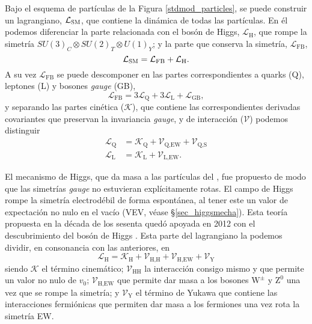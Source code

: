 Bajo el esquema de partículas de la Figura \ref{stdmod_particles}, se puede construir un lagrangiano, $\mathcal{L}_{\text{\textsc{SM}}}$, que contiene la dinámica de todas las partículas. En él podemos diferenciar la parte relacionada con el bosón de Higgs, $\mathcal{L}_{\text{H}}$, que rompe la simetría $ SU(3)_C \otimes SU(2)_T \otimes U(1)_Y $; y la parte que conserva la simetría, $\mathcal{L}_{\text{FB}}$,
\begin{equation}
\mathcal{L}_{\text{\textsc{SM}}} = \mathcal{L}_{\text{FB}} + \mathcal{L}_{\text{H}}.
\end{equation}
A su vez $\mathcal{L}_{\text{FB}}$ se puede descomponer en las partes correspondientes a quarks (Q), leptones (L) y bosones \emph{gauge} (GB),
\begin{equation}
\mathcal{L}_{\text{FB}} = 3 \mathcal{L}_{\text{Q}} + 3 \mathcal{L}_{\text{L}} + \mathcal{L}_{\text{GB}},	
\end{equation}
y separando las partes cinética ($\mathcal{K}$), que contiene las correspondientes derivadas covariantes que preservan la invariancia \emph{gauge}, y de interacción ($\mathcal{V}$) podemos distinguir
\begin{equation}
\begin{split}
\mathcal{L}_{\text{Q}} &= \mathcal{K}_{\text{Q}} + \mathcal{V}_{\text{Q,EW}} + \mathcal{V}_{\text{Q,S}} \\
\mathcal{L}_{\text{L}} &= \mathcal{K}_{\text{L}} + \mathcal{V}_{\text{L,EW}} .
\end{split}	
\end{equation}

El mecanismo de Higgs, que da masa a las partículas del \stdmod, fue propuesto de modo que las simetrías \emph{gauge} no estuvieran explícitamente rotas. El campo de Higgs rompe la simetría electrodébil de forma espontánea, al tener este un valor de expectación no nulo en el vacío (VEV, véase \S \ref{sec_higgsmecha}). Esta teoría propuesta en la década de los sesenta quedó \color{vero} apoyada \color{norm} en 2012 con el descubrimiento del bosón de Higgs \cite{Aad:2012tfa,Chatrchyan:2012xdj}. Esta parte del lagrangiano la podemos dividir, en consonancia con las anteriores, en
\[\mathcal{L}_{\text{H}} = \mathcal{K}_{\text{H}} + \mathcal{V}_{\text{H,H}} + \mathcal{V}_{\text{H,EW}} + \mathcal{V}_{\text{Y}}\]
siendo $\mathcal{K}$ el término cinemático; $\mathcal{V}_{\text{HH}}$ la interacción consigo mismo y que permite un valor no nulo de $v_0$; $\mathcal{V}_{\text{H,EW}}$ 
que permite dar masa a los bosones $\mathrm{W^{\pm}}$ y $\mathrm{Z^0}$ una vez que se rompe la simetría; y  $\mathcal{V}_{\text{Y}}$ el término de Yukawa que contiene las interacciones fermiónicas que permiten dar masa a los fermiones una vez rota la simetría EW.


